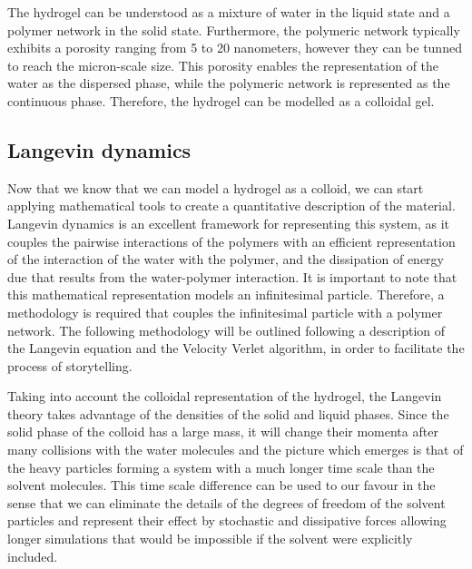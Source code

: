 The hydrogel can be understood as a mixture of water in the liquid state and a polymer network in the solid state.
Furthermore, the polymeric network typically exhibits a porosity ranging from 5 to 20 nanometers, however they can be tunned to reach the micron-scale size.
This porosity enables the representation of the water as the dispersed phase, while the polymeric network is represented as the continuous phase.
Therefore, the hydrogel can be modelled as a colloidal gel.


\subsection{Langevin dynamics}

Now that we know that we can model a hydrogel as a colloid, we can start applying mathematical tools to create a quantitative description of the material.
Langevin dynamics is an excellent framework for representing this system, as it couples 
    the pairwise interactions of the polymers 
    with an efficient representation of the interaction of the water with the polymer, 
    and the dissipation of energy due that results from the water-polymer interaction.
It is important to note that this mathematical representation models an infinitesimal particle.
Therefore, a methodology is required that couples the infinitesimal particle with a polymer network.
The following methodology will be outlined following a description of the Langevin equation and the Velocity Verlet algorithm, in order to facilitate the process of storytelling.


Taking into account the colloidal representation of the hydrogel, the Langevin theory takes advantage of the densities of the solid and liquid phases.
Since the solid phase of the colloid has a large mass, it will change their momenta after many collisions with the water molecules and the picture which emerges is that of the heavy particles forming a system with a much longer time scale than the solvent molecules\citep{Thijssen2007}.
This time scale difference can be used to our favour in the sense that we can eliminate the details of the degrees of freedom of the solvent particles and represent their effect by stochastic and dissipative forces allowing longer simulations that would be impossible if the solvent were explicitly included\citep{pastorTechniquesApplicationsLangevin1994}.

